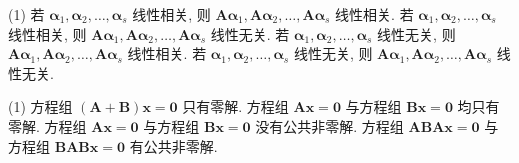 \begin{tasks}(1)
  \task 若 $\displaystyle \bm{\alpha}_1, \bm{\alpha}_2, \dots, \bm{\alpha}_s$ 线性相关, 则 $\displaystyle \bm{A}\bm{\alpha}_1, \bm{A}\bm{\alpha}_2, \dots, \bm{A}\bm{\alpha}_s$ 线性相关.
  \task 若 $\displaystyle \bm{\alpha}_1, \bm{\alpha}_2, \dots, \bm{\alpha}_s$ 线性相关, 则 $\displaystyle \bm{A}\bm{\alpha}_1, \bm{A}\bm{\alpha}_2, \dots, \bm{A}\bm{\alpha}_s$ 线性无关.
  \task 若 $\displaystyle \bm{\alpha}_1, \bm{\alpha}_2, \dots, \bm{\alpha}_s$ 线性无关, 则 $\displaystyle \bm{A}\bm{\alpha}_1, \bm{A}\bm{\alpha}_2, \dots, \bm{A}\bm{\alpha}_s$ 线性相关.
  \task 若 $\displaystyle \bm{\alpha}_1, \bm{\alpha}_2, \dots, \bm{\alpha}_s$ 线性无关, 则 $\displaystyle \bm{A}\bm{\alpha}_1, \bm{A}\bm{\alpha}_2, \dots, \bm{A}\bm{\alpha}_s$ 线性无关.
\end{tasks}
\vspace{8em}

\begin{tasks}(1)
  \task 方程组 $\displaystyle (\bm{A} + \bm{B})\bm{x} = \bm{0}$ 只有零解.
  \task 方程组 $\displaystyle \bm{A}\bm{x} = \bm{0}$ 与方程组 $\displaystyle \bm{B}\bm{x} = \bm{0}$ 均只有零解.
  \task 方程组 $\displaystyle \bm{A}\bm{x} = \bm{0}$ 与方程组 $\displaystyle \bm{B}\bm{x} = \bm{0}$ 没有公共非零解.
  \task 方程组 $\displaystyle \bm{ABA}\bm{x} = \bm{0}$ 与方程组 $\displaystyle \bm{BAB}\bm{x} = \bm{0}$ 有公共非零解.
\end{tasks}

